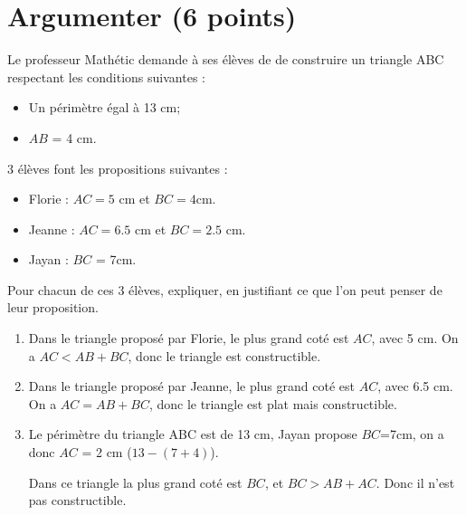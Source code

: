 \section{Argumenter (6 points)}

Le professeur Mathétic demande à ses élèves de  de construire un triangle ABC respectant les conditions suivantes :

\begin{itemize}
	\item Un périmètre égal à 13 cm;
	\item $AB$ = 4 cm.
\end{itemize}

3 élèves font les propositions suivantes :
\begin{itemize}
	\item Florie : $AC = 5$ cm et $BC= \num{4}$cm.
	\item Jeanne :  $AC = \num{6.5}$ cm et $BC= \num{2.5}$ cm.
	\item Jayan : $BC$ = 7cm.
\end{itemize}

\begin{questions}
	\question[6] Pour chacun de ces 3 élèves, expliquer, en justifiant ce que l'on peut penser de leur proposition.
	
	\begin{solution}
		\begin{enumerate}
			\item Dans le triangle proposé par Florie, le plus grand coté est $AC$, avec 5 cm. On a $AC < AB + BC$, donc le triangle est constructible.
			
			\item Dans le triangle proposé par Jeanne, le plus grand coté est $AC$, avec \num{6.5} cm. On a $AC = AB + BC$, donc le triangle est plat mais constructible.
			
			\item Le périmètre du triangle ABC est de 13 cm, Jayan propose $BC$=7cm, on a donc $AC$ = 2 cm ($13 - (7 + 4)$).
			
			Dans ce triangle la plus grand coté est $BC$, et $BC > AB + AC$. Donc il n'est pas constructible.
		\end{enumerate}
	\end{solution}
\end{questions}